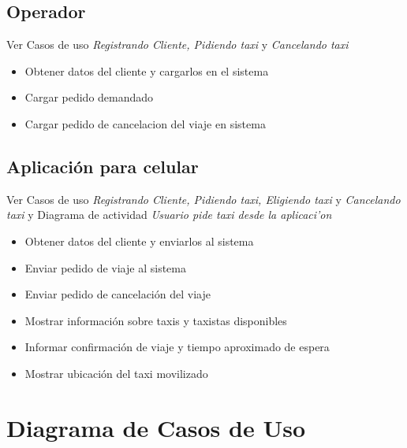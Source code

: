 \documentclass[a4paper]{article}
\begin{document}
\subsection{Operador}
Ver Casos de uso \textit{Registrando Cliente, Pidiendo taxi} y \textit{Cancelando taxi}
\begin{itemize}
\item Obtener datos del cliente y cargarlos en el sistema
\item Cargar pedido demandado
\item Cargar pedido de cancelacion del viaje en sistema
\end{itemize}

\subsection{Aplicaci\'on para celular}
Ver Casos de uso \textit{Registrando Cliente, Pidiendo taxi, Eligiendo taxi} y \textit{Cancelando taxi} y 
Diagrama de actividad \textit{Usuario pide taxi desde la aplicaci'on}
\begin{itemize}
\item Obtener datos del cliente y enviarlos al sistema
\item Enviar pedido de viaje al sistema
\item Enviar pedido de cancelaci\'on del viaje
\item Mostrar informaci\'on sobre taxis y taxistas disponibles
\item Informar confirmaci\'on de viaje y tiempo aproximado de espera
\item Mostrar ubicaci\'on del taxi movilizado 
\end{itemize}

\section{Diagrama de Casos de Uso}
\end{document}
